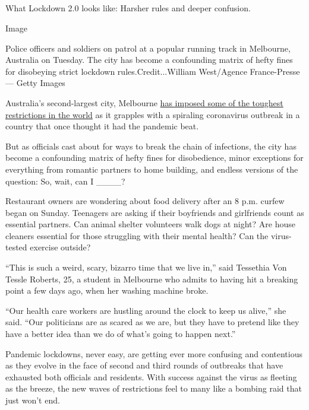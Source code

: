 \hypertarget{-7}{%
\subsection{}\label{-7}}

What Lockdown 2.0 looks like: Harsher rules and deeper confusion.

Image

Police officers and soldiers on patrol at a popular running track in
Melbourne, Australia on Tuesday. The city has become a confounding
matrix of hefty fines for disobeying strict lockdown
rules.Credit...William West/Agence France-Presse --- Getty Images

Australia's second-largest city, Melbourne
\href{https://www.nytimes3xbfgragh.onion/2020/08/04/world/australia/coronavirus-melbourne-lockdown.html}{has
imposed some of the toughest restrictions in the world} as it grapples
with a spiraling coronavirus outbreak in a country that once thought it
had the pandemic beat.

But as officials cast about for ways to break the chain of infections,
the city has become a confounding matrix of hefty fines for
disobedience, minor exceptions for everything from romantic partners to
home building, and endless versions of the question: So, wait, can I
\_\_\_\_?

Restaurant owners are wondering about food delivery after an 8 p.m.
curfew began on Sunday. Teenagers are asking if their boyfriends and
girlfriends count as essential partners. Can animal shelter volunteers
walk dogs at night? Are house cleaners essential for those struggling
with their mental health? Can the virus-tested exercise outside?

``This is such a weird, scary, bizarro time that we live in,'' said
Tessethia Von Tessle Roberts, 25, a student in Melbourne who admits to
having hit a breaking point a few days ago, when her washing machine
broke.

``Our health care workers are hustling around the clock to keep us
alive,'' she said. ``Our politicians are as scared as we are, but they
have to pretend like they have a better idea than we do of what's going
to happen next.''

Pandemic lockdowns, never easy, are getting ever more confusing and
contentious as they evolve in the face of second and third rounds of
outbreaks that have exhausted both officials and residents. With success
against the virus as fleeting as the breeze, the new waves of
restrictions feel to many like a bombing raid that just won't end.

